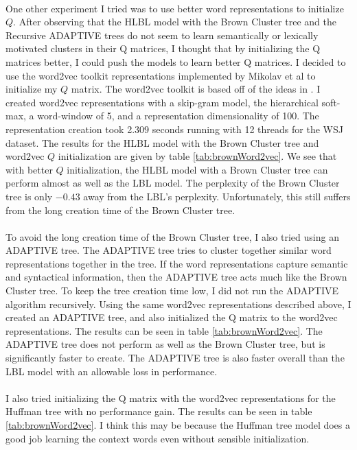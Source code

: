 \paragraph{}
One other experiment I tried was to use better word representations to initialize $Q$. After observing that the HLBL model with the Brown Cluster tree and the Recursive ADAPTIVE trees do not seem to learn semantically or lexically motivated clusters in their Q matrices, I thought that by initializing the Q matrices better, I could push the models to learn better Q matrices. I decided to use the word2vec toolkit representations implemented by Mikolav et al to initialize my $Q$ matrix. The word2vec toolkit is based off of the ideas in \cite{Mikolov2013}. I created word2vec representations with a skip-gram model, the hierarchical soft-max, a word-window of 5, and a representation dimensionality of 100. The representation creation took 2.309 seconds running with 12 threads for the WSJ dataset. The results for the HLBL model with the Brown Cluster tree and word2vec $Q$ initialization are given by table \ref{tab:brownWord2vec}. We see that with better $Q$ initialization, the HLBL model with a Brown Cluster tree can perform almost as well as the LBL model. The perplexity of the Brown Cluster tree is only $-0.43$ away from the LBL's perplexity. Unfortunately, this still suffers from the long creation time of the Brown Cluster tree.
\paragraph{}
To avoid the long creation time of the Brown Cluster tree, I also tried using an ADAPTIVE tree. The ADAPTIVE tree tries to cluster together similar word representations together in the tree. If the word representations capture semantic and syntactical information, then the ADAPTIVE tree acts much like the Brown Cluster tree. To keep the tree creation time low, I did not run the ADAPTIVE algorithm recursively. Using the same word2vec representations described above, I created an ADAPTIVE tree, and also initialized the Q matrix to the word2vec representations. The results can be seen in table \ref{tab:brownWord2vec}. The ADAPTIVE tree does not perform as well as the Brown Cluster tree, but is significantly faster to create. The ADAPTIVE tree is also faster overall than the LBL model with an allowable loss in performance. 

\paragraph{}
I also tried initializing the Q matrix with the word2vec representations for the Huffman tree with no performance gain. The results can be seen in table \ref{tab:brownWord2vec}. I think this may be because the Huffman tree model does a good job learning the context words even without sensible initialization. 

